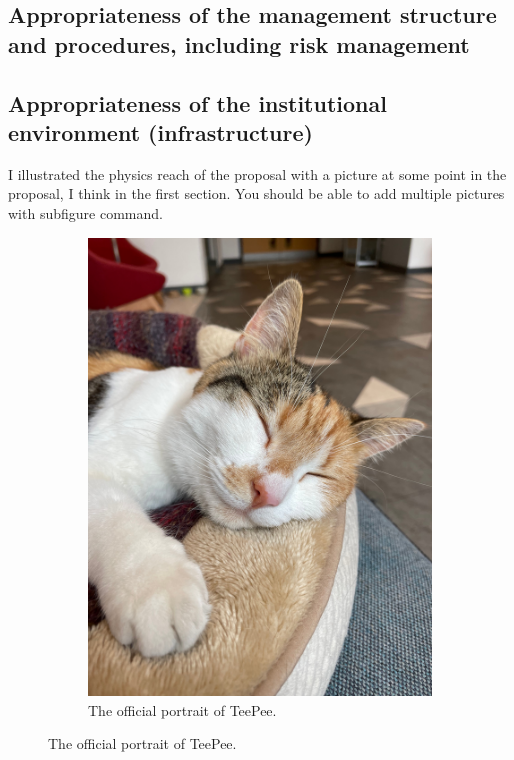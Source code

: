 \documentclass[a4paper,11pt]{extarticle}
\begin{document}
\subsection{Appropriateness of the management structure and procedures, including risk management}
\subsection{Appropriateness of the institutional environment (infrastructure)}
I illustrated the physics reach of the proposal with a picture at some point in the proposal, I think in the first section. You should be able to add multiple pictures with subfigure command.
\begin{figure}
\begin{subfigure}{.5\textwidth}
  \centering
  \includegraphics[scale=0.07]{figures/teepee_1.jpg}
  \caption{The official portrait of TeePee. 
  }
  \label{fig:teepee_1}
\end{subfigure}%

\end{figure}
\end{document}
